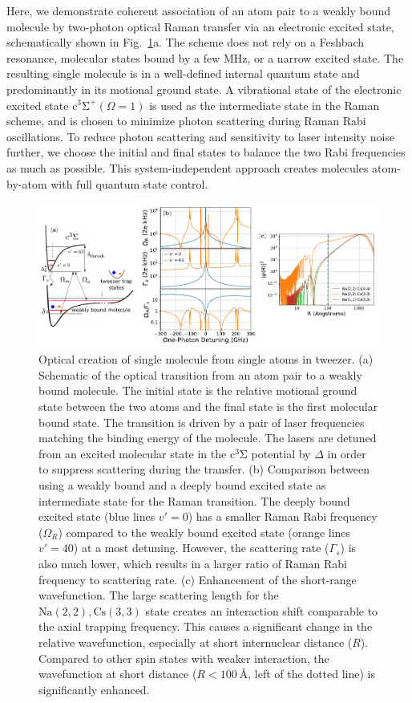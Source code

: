 \documentclass[aps,prl,twocolumn,10pt,superscriptaddress]{revtex4-1}
\newcommand{\Na}{\mathrm{Na}}
\newcommand{\Cs}{\mathrm{Cs}}
\begin{document}
Here, we demonstrate coherent association of an atom pair to a weakly bound molecule
by two-photon optical Raman transfer via an electronic excited state,
schematically shown in Fig.~\ref{f-theory}a.
The scheme does not rely on a Feshbach resonance,
molecular states bound by a few MHz, or a narrow excited state.
The resulting single molecule is in a well-defined internal quantum state
and predominantly in its motional ground state.
A vibrational state of the electronic excited state $\mathrm{c^3\Sigma^+}(\Omega = 1)$
is used as the intermediate state in the Raman scheme,
and is chosen to minimize photon scattering during Raman Rabi oscillations.
To reduce photon scattering and sensitivity to laser intensity noise further,
we choose the initial and final states to balance the two Rabi frequencies as much as possible.
This system-independent approach creates molecules atom-by-atom with full quantum state control.


\begin{figure}
  \includegraphics[width=\textwidth]{imgs/fig-theory.pdf}
  \caption{Optical creation of single molecule from single atoms in tweezer.
    (a) Schematic of the optical transition from an atom pair to a weakly bound molecule.
    The initial state is the relative motional ground state between the two atoms
    and the final state is the first molecular bound state.
    The transition is driven by a pair of laser frequencies matching the binding energy
    of the molecule.
    The lasers are detuned from an excited molecular state in the $\mathrm{c^3\Sigma}$ potential
    by $\Delta$ in order to suppress scattering during the transfer.
    (b) Comparison between using a weakly bound and a deeply bound excited state
    as intermediate state for the Raman transition.
    The deeply bound excited state (blue lines $v'=0$)
    has a smaller Raman Rabi frequency ($\Omega_{R}$)
    compared to the weakly bound excited state (orange lines $v'=40$) at a most detuning.
    However, the scattering rate ($\Gamma_{s}$) is also much lower,
    which results in a larger ratio of Raman Rabi frequency to scattering rate.
    (c) Enhancement of the short-range wavefunction.
    The large scattering length for the $\Na(2,2),\Cs(3,3)$ state creates an interaction shift
    comparable to the axial trapping frequency.
    This causes a significant change in the relative wavefunction, especially at short
    internuclear distance ($R$).
    Compared to other spin states with weaker interaction,
    the wavefunction at short distance ($R<100\ \text{\AA}$, left of the dotted line)
    is significantly enhanced.
    \label{f-theory}
  }
\end{figure}
\end{document}
